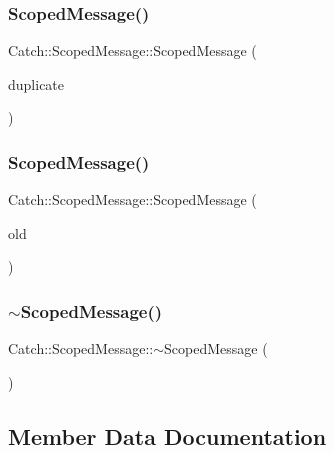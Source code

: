 \mbox{\label{class_catch_1_1_scoped_message_a5fe2e79afdfd737818c15edfc49f378e}} 
\subsubsection{ScopedMessage()\hspace{0.1cm}{\footnotesize\ttfamily [2/3]}}
{\footnotesize\ttfamily Catch\+::\+Scoped\+Message\+::\+Scoped\+Message (\begin{DoxyParamCaption}\item[{\textbf{ Scoped\+Message} \&}]{duplicate }\end{DoxyParamCaption})\hspace{0.3cm}{\ttfamily [delete]}}

\mbox{\label{class_catch_1_1_scoped_message_aac833a6a2245a26e6bd5c9252ca1caa0}} 
\subsubsection{ScopedMessage()\hspace{0.1cm}{\footnotesize\ttfamily [3/3]}}
{\footnotesize\ttfamily Catch\+::\+Scoped\+Message\+::\+Scoped\+Message (\begin{DoxyParamCaption}\item[{\textbf{ Scoped\+Message} \&\&}]{old }\end{DoxyParamCaption})}

\mbox{\label{class_catch_1_1_scoped_message_a43190843f9eeb84a0b42b0bc95fdf93a}} 
\subsubsection{$\sim$ScopedMessage()}
{\footnotesize\ttfamily Catch\+::\+Scoped\+Message\+::$\sim$\+Scoped\+Message (\begin{DoxyParamCaption}{ }\end{DoxyParamCaption})}



\subsection{Member Data Documentation}
\mbox{\label{class_catch_1_1_scoped_message_ae6e1476f389cc6e1586f033b3747b27b}} 
